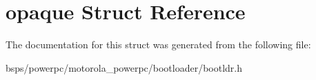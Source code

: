 \hypertarget{structopaque}{}\section{opaque Struct Reference}
\label{structopaque}


The documentation for this struct was generated from the following file\+:\begin{DoxyCompactItemize}
\item 
bsps/powerpc/motorola\+\_\+powerpc/bootloader/bootldr.\+h\end{DoxyCompactItemize}
